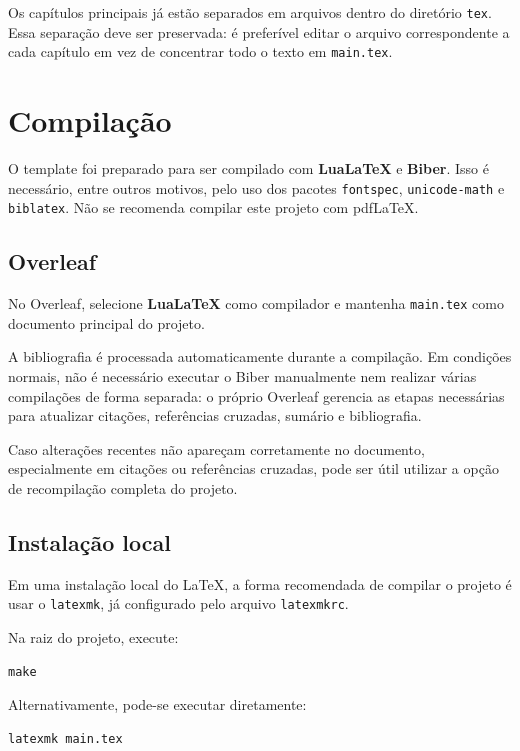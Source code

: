 Os capítulos principais já estão separados em arquivos dentro do diretório \verb|tex|. Essa separação deve ser preservada: é preferível editar o arquivo correspondente a cada capítulo em vez de concentrar todo o texto em \verb|main.tex|.

\section{Compilação}
\label{sec:compilacao}

O template foi preparado para ser compilado com \textbf{LuaLaTeX} e \textbf{Biber}. Isso é necessário, entre outros motivos, pelo uso dos pacotes \verb|fontspec|, \verb|unicode-math| e \verb|biblatex|. Não se recomenda compilar este projeto com pdfLaTeX.

\subsection{Overleaf}
\label{ssec:overleaf}

No Overleaf, selecione \textbf{LuaLaTeX} como compilador e mantenha \verb|main.tex| como documento principal do projeto.

A bibliografia é processada automaticamente durante a compilação. Em condições normais, não é necessário executar o Biber manualmente nem realizar várias compilações de forma separada: o próprio Overleaf gerencia as etapas necessárias para atualizar citações, referências cruzadas, sumário e bibliografia.

Caso alterações recentes não apareçam corretamente no documento, especialmente em citações ou referências cruzadas, pode ser útil utilizar a opção de recompilação completa do projeto.


\subsection{Instalação local}
\label{ssec:run_local}

Em uma instalação local do LaTeX, a forma recomendada de compilar o projeto é usar o \verb|latexmk|, já configurado pelo arquivo \verb|latexmkrc|.

Na raiz do projeto, execute:

\begin{verbatim}
make
\end{verbatim}

Alternativamente, pode-se executar diretamente:

\begin{verbatim}
latexmk main.tex
\end{verbatim}

